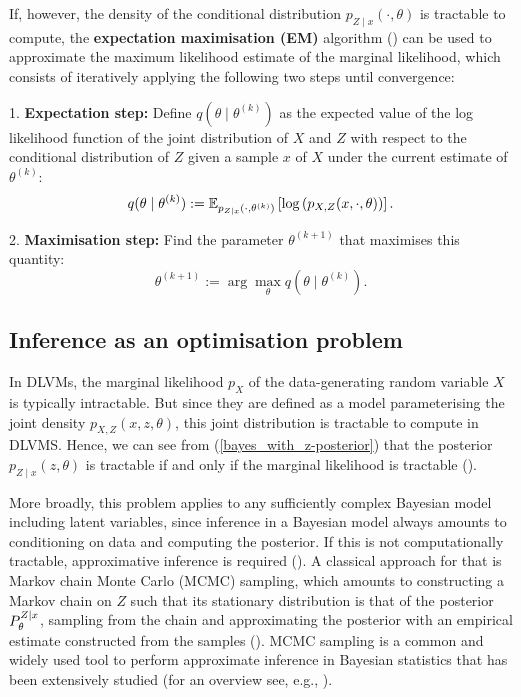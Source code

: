 If, however, the density of the conditional distribution $p_{Z\mid x}(\cdot,\theta)$ is tractable to compute, the \textbf{expectation maximisation (EM)} algorithm (\cite{Rubin1977}) can be used to approximate the maximum likelihood estimate of the marginal likelihood, which consists of iteratively applying the following two steps until convergence:

1. \textbf{Expectation step:} Define $q(\theta\mid \theta^{(k)})$ as the expected value of the log likelihood function of the joint distribution of $X$ and $Z$ with respect to the conditional distribution of $Z$ given a sample $x$ of $X$ under the current estimate of $\theta^{(k)}$:
$$
	q(\theta\mid \theta^{(k)}) := \E_{p_{Z\mid x}(\cdot, \theta^{(k)})}\left[\log\left(p_{X,Z}(x, \cdot, \theta)\right)\right].
$$

2. \textbf{Maximisation step:} Find the parameter $\theta^{(k+1)}$ that maximises this quantity:
$$
	\theta^{(k+1)} := \arg \max_{\theta} q\left(\theta\mid \theta^{(k)}\right).
$$

\subsection{Inference as an optimisation problem}\label{sec:inference_as_optimisation}

In DLVMs, the marginal likelihood $p_{X}$ of the data-generating random variable $X$ is typically intractable. But since they are defined as a model parameterising the joint density $p_{X,Z}(x,z,\theta)$, this joint distribution is tractable to compute in DLVMS. Hence, we can see from (\ref{bayes_with_z-posterior}) that the posterior $p_{Z\mid x}(z, \theta)$ is tractable if and only if the marginal likelihood is tractable (\cite[p.~14]{Kingma2019}). 

More broadly, this problem applies to any sufficiently complex Bayesian model including latent variables, since inference in a Bayesian model always amounts to conditioning on data and computing the posterior. If this is not computationally tractable, approximative inference is required (\cite[p.~2]{Blei}). A classical approach for that is Markov chain Monte Carlo (MCMC) sampling, which amounts to constructing a Markov chain on $Z$ such that its stationary distribution is that of the posterior $\P_{\theta}^{Z\mid x}$, sampling from the chain and approximating the posterior with an empirical estimate constructed from the samples (\cite[p.~2]{Blei}). MCMC sampling is a common and widely used tool to perform approximate inference in Bayesian statistics that has been extensively studied (for an overview see, e.g., \cite{Casella2004}). 

